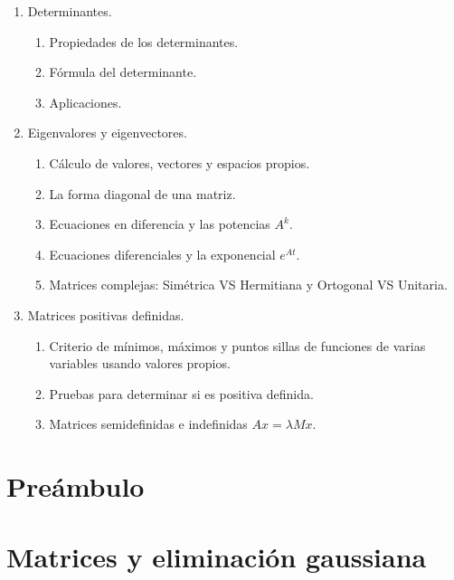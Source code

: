 \documentclass[8pt]{article}
\begin{document}
\begin{multicols}{2}
\begin{enumerate}
\begin{enumerate}
        \end{enumerate}
        \item Determinantes.
        \begin{enumerate}
            \item Propiedades de los determinantes. 
            \item Fórmula del determinante.
            \item Aplicaciones.
        \end{enumerate}
        \item Eigenvalores y eigenvectores.
        \begin{enumerate}
            \item Cálculo de valores, vectores y espacios propios.
            \item La forma diagonal de una matriz.
            \item Ecuaciones en diferencia y las potencias $A^k$.
            \item Ecuaciones diferenciales y la exponencial $e^{At}$.
            \item Matrices complejas: Simétrica VS Hermitiana y Ortogonal VS Unitaria.
        \end{enumerate}
        \item Matrices positivas definidas.
        \begin{enumerate}
            \item Criterio de mínimos, máximos y puntos sillas de funciones de varias variables usando valores propios.
            \item Pruebas para determinar si es positiva definida.
            \item Matrices semidefinidas e indefinidas $Ax=\lambda Mx$.
        \end{enumerate}
    \end{enumerate}
\end{multicols}



\section*{Preámbulo}
\label{sec:preambulo}



\section{Matrices y eliminación gaussiana}
\label{sec:matrices_y_eliminacion_gaussiana}


% 
\end{document}
